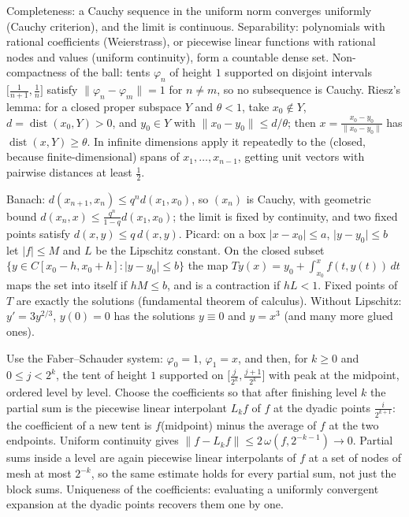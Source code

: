 \documentclass[11pt,a4paper]{article}
\begin{document}

Completeness: a Cauchy sequence in the uniform norm converges uniformly (Cauchy criterion), and the limit is continuous. Separability: polynomials with rational coefficients (Weierstrass), or piecewise linear functions with rational nodes and values (uniform continuity), form a countable dense set.
Non-compactness of the ball: tents \(\varphi_n\) of height \(1\) supported on disjoint intervals \(\bigl[\frac1{n+1},\frac1n\bigr]\) satisfy \(\lVert\varphi_n-\varphi_m\rVert=1\) for \(n\ne m\), so no subsequence is Cauchy.
Riesz's lemma: for a closed proper subspace \(Y\) and \(\theta\lt1\), take \(x_0\notin Y\), \(d=\operatorname{dist}(x_0,Y)\gt0\), and \(y_0\in Y\) with \(\lVert x_0-y_0\rVert\le d/\theta\); then \(x=\frac{x_0-y_0}{\lVert x_0-y_0\rVert}\) has \(\operatorname{dist}(x,Y)\ge\theta\). In infinite dimensions apply it repeatedly to the (closed, because finite-dimensional) spans of \(x_1,\dots,x_{n-1}\), getting unit vectors with pairwise distances at least \(\frac12\).

Banach: \(d(x_{n+1},x_n)\le q^nd(x_1,x_0)\), so \((x_n)\) is Cauchy, with geometric bound \(d(x_n,x)\le\frac{q^n}{1-q}d(x_1,x_0)\); the limit is fixed by continuity, and two fixed points satisfy \(d(x,y)\le q\,d(x,y)\).
Picard: on a box \(\lvert x-x_0\rvert\le a\), \(\lvert y-y_0\rvert\le b\) let \(\lvert f\rvert\le M\) and \(L\) be the Lipschitz constant. On the closed subset \(\{y\in C[x_0-h,x_0+h]:\lvert y-y_0\rvert\le b\}\) the map \(Ty(x)=y_0+\int_{x_0}^xf(t,y(t))\,dt\) maps the set into itself if \(hM\le b\), and is a contraction if \(hL\lt1\). Fixed points of \(T\) are exactly the solutions (fundamental theorem of calculus).
Without Lipschitz: \(y'=3y^{2/3}\), \(y(0)=0\) has the solutions \(y\equiv0\) and \(y=x^3\) (and many more glued ones).

Use the Faber--Schauder system: \(\varphi_0=1\), \(\varphi_1=x\), and then, for \(k\ge0\) and \(0\le j\lt2^k\), the tent of height \(1\) supported on \(\bigl[\frac j{2^k},\frac{j+1}{2^k}\bigr]\) with peak at the midpoint, ordered level by level.
Choose the coefficients so that after finishing level \(k\) the partial sum is the piecewise linear interpolant \(L_kf\) of \(f\) at the dyadic points \(\frac i{2^{k+1}}\): the coefficient of a new tent is \(f\)(midpoint) minus the average of \(f\) at the two endpoints. Uniform continuity gives \(\lVert f-L_kf\rVert\le2\,\omega(f,2^{-k-1})\to0\).
Partial sums inside a level are again piecewise linear interpolants of \(f\) at a set of nodes of mesh at most \(2^{-k}\), so the same estimate holds for every partial sum, not just the block sums. Uniqueness of the coefficients: evaluating a uniformly convergent expansion at the dyadic points recovers them one by one.
\end{document}
